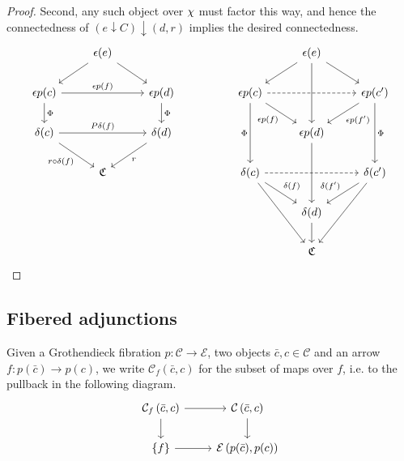 \documentclass[a4paper,10pt
,draft
]{article}%
\renewcommand{\1}{\eta}%
\begin{document}
\begin{proof}
      Second, any such object over $\chi$ must factor this way, and hence the connectedness of $(e \downarrow C) \downarrow (d,r)$
      implies the desired connectedness.
      \begin{equation}
            \begin{tikzcd}
                  &
                  \epsilon(e) \arrow[dr] \arrow[dl]
                  &
                  && %
                  &
                  \epsilon(e) \arrow[dr] \arrow[dl] \arrow[dd]
                  \\
                  \epsilon p(c) \arrow[rr, "{\epsilon p (f)}"] \arrow[d, "\Phi"]
                  &&
                  \epsilon p(d) \arrow[d, "\Phi"]
                  && %
                  \epsilon p (c) \arrow[dr, "{\epsilon p (f)}"'] \arrow[dd, "\Phi"'] \arrow[rr, dashed]
                  &&
                  \epsilon p (c') \arrow[dl, "{\epsilon p (f')}"] \arrow[dd, "\Phi"]
                  \\
                  \delta(c) \arrow[rr, "{P\delta(f)}"] \arrow[dr, "{r \circ \delta(f)}"']
                  &&
                  \delta(d) \arrow[dl, "r"]
                  && %
                  &
                  \epsilon p (d) \arrow[dd]
                  \\
                  &
                  \mathfrak C
                  &
                  && %
                  \delta (c) \arrow[dr, "{\delta(f)}"] \arrow[ddr] \arrow[rr, dashed]
                  &&
                  \delta(c') \arrow[dl, "{\delta(f')}"'] \arrow[ddl]
                  \\
                  &&&& %
                  &
                  \delta(d) \arrow[d]
                  \\
                  &&&& %
                  &
                  \mathfrak C
            \end{tikzcd}
      \end{equation}
\end{proof}





\subsection{Fibered adjunctions}



\begin{notation}
Given a Grothendieck fibration $p\colon \mathcal{C} \to \mathcal{E}$, 
two objects $\bar{c},c \in \mathcal{C}$
and an arrow $f \colon p(\bar{c}) \to p(c)$, 
we write $\mathcal{C}_f(\bar{c},c)$ for the subset of maps over $f$, i.e. to the pullback in the following diagram.
\begin{equation}
\begin{tikzcd}
		\mathcal{C}_f\left(\bar{c},c \right) \arrow[d] \arrow[r]
	&
		\mathcal{C}\left(\bar{c},c \right) \arrow[d]
\\
		\{f\} \arrow[r]
	&
		\mathcal{E}\left(p(\bar{c}),p(c)\right)
\end{tikzcd}
\end{equation}
\end{notation}
\end{document}
